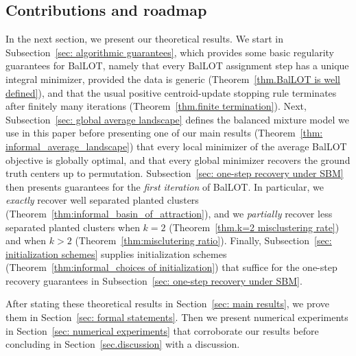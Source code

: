 \documentclass{article}
\theoremstyle{plain}
\theoremstyle{definition}
\newcommand{\1}{\mathbf{1}}
\begin{document}
\subsection{Contributions and roadmap}

In the next section, we present our theoretical results.
We start in Subsection~\ref{sec: algorithmic guarantees}, which provides some basic regularity guarantees for BalLOT, namely that every BalLOT assignment step has a unique integral minimizer, provided the data is generic (Theorem~\ref{thm.BalLOT is well defined}), and that the usual positive centroid-update stopping rule terminates after finitely many iterations (Theorem~\ref{thm.finite termination}).
Next, Subsection~\ref{sec: global average landscape} defines the balanced mixture model we use in this paper before presenting one of our main results (Theorem~\ref{thm: informal_average_landscape}) that every local minimizer of the average BalLOT objective is globally optimal, and that every global minimizer recovers the ground truth centers up to permutation.
Subsection~\ref{sec: one-step recovery under SBM} then presents guarantees for the \textit{first iteration} of BalLOT.
In particular, we \textit{exactly} recover well separated planted clusters (Theorem~\ref{thm:informal_basin_of_attraction}), and we \textit{partially} recover less separated planted clusters when $k=2$ (Theorem~\ref{thm.k=2 misclustering rate}) and when $k>2$ (Theorem~\ref{thm:misclutering ratio}).
Finally, Subsection~\ref{sec: initialization schemes} supplies initialization schemes (Theorem~\ref{thm:informal_choices of initialization}) that suffice for the one-step recovery guarantees in Subsection~\ref{sec: one-step recovery under SBM}.

After stating these theoretical results in Section~\ref{sec: main results}, we prove them in Section~\ref{sec: formal statements}.
Then we present numerical experiments in Section~\ref{sec: numerical experiments} that corroborate our results before concluding in Section~\ref{sec.discussion} with a discussion.








\end{document}

